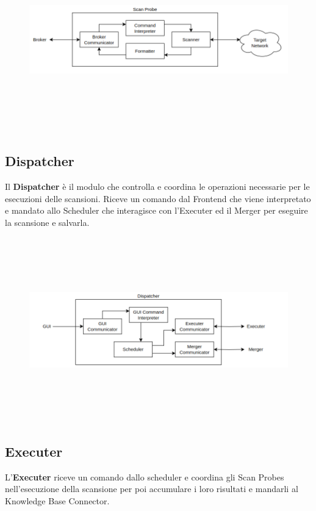 \documentclass[target=bach,aauheader=,style=]{thud}
\begin{document}
\begin{figure}[h]
  \includegraphics[width=14cm, height=8cm]{probe}
  \centering
\end{figure}
\FloatBarrier


\subsection{Dispatcher} 
Il \textbf{Dispatcher} è il modulo che controlla e coordina le operazioni necessarie per le esecuzioni delle scansioni.
Riceve un comando dal Frontend che viene interpretato e mandato allo Scheduler che interagisce con l'Executer ed il Merger per eseguire la scansione e salvarla.

\begin{figure}[h]
  \includegraphics[width=14cm, height=8cm]{dispatcher}
  \centering
\end{figure}

\FloatBarrier

\subsection{Executer} 
L'\textbf{Executer} riceve un comando dallo scheduler e coordina gli Scan Probes nell'esecuzione della scansione per poi accumulare i loro risultati e mandarli al Knowledge Base Connector.
\end{document}
